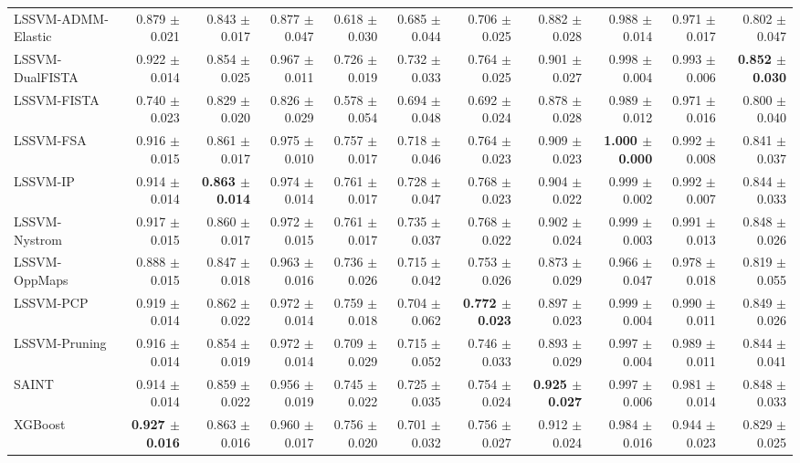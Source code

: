 \begin{table}[ht]
{\begin{tabular}{lrrrrrrrrrr}
LSSVM-ADMM-Elastic & 0.879 $\pm$ 0.021 & 0.843 $\pm$ 0.017 & 0.877 $\pm$ 0.047 & 0.618 $\pm$ 0.030 & 0.685 $\pm$ 0.044 & 0.706 $\pm$ 0.025 & 0.882 $\pm$ 0.028 & 0.988 $\pm$ 0.014 & 0.971 $\pm$ 0.017 & 0.802 $\pm$ 0.047 \\
LSSVM-DualFISTA & 0.922 $\pm$ 0.014 & 0.854 $\pm$ 0.025 & 0.967 $\pm$ 0.011 & 0.726 $\pm$ 0.019 & 0.732 $\pm$ 0.033 & 0.764 $\pm$ 0.025 & 0.901 $\pm$ 0.027 & 0.998 $\pm$ 0.004 & 0.993 $\pm$ 0.006 & \textbf{0.852 $\pm$ 0.030} \\
LSSVM-FISTA & 0.740 $\pm$ 0.023 & 0.829 $\pm$ 0.020 & 0.826 $\pm$ 0.029 & 0.578 $\pm$ 0.054 & 0.694 $\pm$ 0.048 & 0.692 $\pm$ 0.024 & 0.878 $\pm$ 0.028 & 0.989 $\pm$ 0.012 & 0.971 $\pm$ 0.016 & 0.800 $\pm$ 0.040 \\
LSSVM-FSA & 0.916 $\pm$ 0.015 & 0.861 $\pm$ 0.017 & 0.975 $\pm$ 0.010 & 0.757 $\pm$ 0.017 & 0.718 $\pm$ 0.046 & 0.764 $\pm$ 0.023 & 0.909 $\pm$ 0.023 & \textbf{1.000 $\pm$ 0.000} & 0.992 $\pm$ 0.008 & 0.841 $\pm$ 0.037 \\
LSSVM-IP & 0.914 $\pm$ 0.014 & \textbf{0.863 $\pm$ 0.014} & 0.974 $\pm$ 0.014 & 0.761 $\pm$ 0.017 & 0.728 $\pm$ 0.047 & 0.768 $\pm$ 0.023 & 0.904 $\pm$ 0.022 & 0.999 $\pm$ 0.002 & 0.992 $\pm$ 0.007 & 0.844 $\pm$ 0.033 \\
LSSVM-Nystrom & 0.917 $\pm$ 0.015 & 0.860 $\pm$ 0.017 & 0.972 $\pm$ 0.015 & 0.761 $\pm$ 0.017 & 0.735 $\pm$ 0.037 & 0.768 $\pm$ 0.022 & 0.902 $\pm$ 0.024 & 0.999 $\pm$ 0.003 & 0.991 $\pm$ 0.013 & 0.848 $\pm$ 0.026 \\
LSSVM-OppMaps & 0.888 $\pm$ 0.015 & 0.847 $\pm$ 0.018 & 0.963 $\pm$ 0.016 & 0.736 $\pm$ 0.026 & 0.715 $\pm$ 0.042 & 0.753 $\pm$ 0.026 & 0.873 $\pm$ 0.029 & 0.966 $\pm$ 0.047 & 0.978 $\pm$ 0.018 & 0.819 $\pm$ 0.055 \\
LSSVM-PCP & 0.919 $\pm$ 0.014 & 0.862 $\pm$ 0.022 & 0.972 $\pm$ 0.014 & 0.759 $\pm$ 0.018 & 0.704 $\pm$ 0.062 & \textbf{0.772 $\pm$ 0.023} & 0.897 $\pm$ 0.023 & 0.999 $\pm$ 0.004 & 0.990 $\pm$ 0.011 & 0.849 $\pm$ 0.026 \\
LSSVM-Pruning & 0.916 $\pm$ 0.014 & 0.854 $\pm$ 0.019 & 0.972 $\pm$ 0.014 & 0.709 $\pm$ 0.029 & 0.715 $\pm$ 0.052 & 0.746 $\pm$ 0.033 & 0.893 $\pm$ 0.029 & 0.997 $\pm$ 0.004 & 0.989 $\pm$ 0.011 & 0.844 $\pm$ 0.041 \\
SAINT & 0.914 $\pm$ 0.014 & 0.859 $\pm$ 0.022 & 0.956 $\pm$ 0.019 & 0.745 $\pm$ 0.022 & 0.725 $\pm$ 0.035 & 0.754 $\pm$ 0.024 & \textbf{0.925 $\pm$ 0.027} & 0.997 $\pm$ 0.006 & 0.981 $\pm$ 0.014 & 0.848 $\pm$ 0.033 \\
XGBoost & \textbf{0.927 $\pm$ 0.016} & 0.863 $\pm$ 0.016 & 0.960 $\pm$ 0.017 & 0.756 $\pm$ 0.020 & 0.701 $\pm$ 0.032 & 0.756 $\pm$ 0.027 & 0.912 $\pm$ 0.024 & 0.984 $\pm$ 0.016 & 0.944 $\pm$ 0.023 & 0.829 $\pm$ 0.025 \\
    \bottomrule
  \end{tabular}}
\end{table}